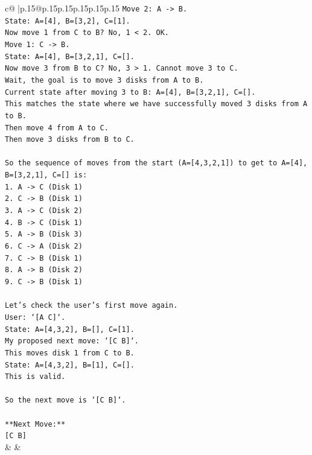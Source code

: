 \documentclass{article}
\begin{document}
{\begin{supertabular}{c@{$\;$}|p{.15\linewidth}@{}p{.15\linewidth}p{.15\linewidth}p{.15\linewidth}p{.15\linewidth}p{.15\linewidth}}
{{{\texttt{Move 2: A {-}> B.} \\
\texttt{State: A={[}4{]}, B={[}3,2{]}, C={[}1{]}.} \\
\texttt{Now move 1 from C to B? No, 1 < 2. OK.} \\
\texttt{Move 1: C {-}> B.} \\
\texttt{State: A={[}4{]}, B={[}3,2,1{]}, C={[}{]}.} \\
\texttt{Now move 3 from B to C? No, 3 > 1. Cannot move 3 to C.} \\
\texttt{Wait, the goal is to move 3 disks from A to B.} \\
\texttt{Current state after moving 3 to B: A={[}4{]}, B={[}3,2,1{]}, C={[}{]}.} \\
\texttt{This matches the state where we have successfully moved 3 disks from A to B.} \\
\texttt{Then move 4 from A to C.} \\
\texttt{Then move 3 disks from B to C.} \\
\\ 
\texttt{So the sequence of moves from the start (A={[}4,3,2,1{]}) to get to A={[}4{]}, B={[}3,2,1{]}, C={[}{]} is:} \\
\texttt{1. A {-}> C (Disk 1)} \\
\texttt{2. C {-}> B (Disk 1)} \\
\texttt{3. A {-}> C (Disk 2)} \\
\texttt{4. B {-}> C (Disk 1)} \\
\texttt{5. A {-}> B (Disk 3)} \\
\texttt{6. C {-}> A (Disk 2)} \\
\texttt{7. C {-}> B (Disk 1)} \\
\texttt{8. A {-}> B (Disk 2)} \\
\texttt{9. C {-}> B (Disk 1)} \\
\\ 
\texttt{Let's check the user's first move again.} \\
\texttt{User: `{[}A C{]}`.} \\
\texttt{State: A={[}4,3,2{]}, B={[}{]}, C={[}1{]}.} \\
\texttt{My proposed next move: `{[}C B{]}`.} \\
\texttt{This moves disk 1 from C to B.} \\
\texttt{State: A={[}4,3,2{]}, B={[}1{]}, C={[}{]}.} \\
\texttt{This is valid.} \\
\\ 
\texttt{So the next move is `{[}C B{]}`.} \\
\\ 
\texttt{**Next Move:**} \\
\texttt{{[}C B{]}} \\
            }
        }
    }
    & & \\ \\


\end{supertabular}}
\end{document}
